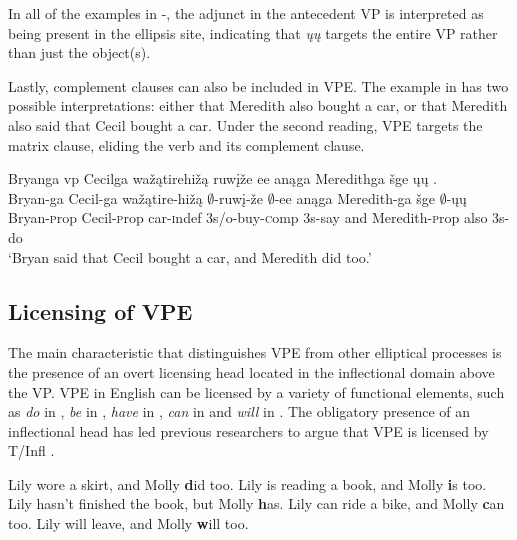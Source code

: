 \documentclass[output=paper]{LSP/langsci}
\begin{document}
In all of the examples in -, the adjunct in the antecedent VP is interpreted as being present in the ellipsis site, indicating that \emph{ųų} targets the entire VP rather than just the object(s).

Lastly, complement clauses can also be included in VPE. The example in  has two possible interpretations: either that Meredith also bought a car, or that Meredith also said that Cecil bought a car. Under the second reading, VPE targets the matrix clause, eliding the verb and its complement clause.

\ea\label{ex:johnson:11}
\glll Bryanga {\ob}{vp} Cecilga wažątirehižą ruwįže ee{\cb} anąga Meredithga šge {\ob}ųų{\cb} .\\
Bryan-ga {} Cecil-ga wažątire-hižą $\emptyset$-ruwį-že $\emptyset$-ee anąga Meredith-ga šge $\emptyset$-ųų\\
Bryan-{\textsc prop} {} Cecil-{\textsc prop} car-{\textsc indef} {\textsc 3s/o}-buy-{\textsc comp} {\textsc 3s}-say and Meredith-{\textsc prop} also {\textsc 3s}-do\\
\trans `Bryan said that Cecil bought a car, and Meredith did too.'
\z


\subsection{Licensing of VPE}\label{sec:johnson:2.2}

The main characteristic that distinguishes VPE from other elliptical processes is the presence of an overt licensing head located in the inflectional domain above the VP. VPE in English can be licensed by a variety of functional elements, such as \emph{do} in , \emph{be} in , \emph{have} in , \emph{can} in  and \emph{will} in . The obligatory presence of an inflectional head has led previous researchers to argue that VPE is licensed by T/Infl \citep{Bresnan1976,Sag1976,Zagona1988,Lobeck1995}.

\ea\label{ex:johnson:12}
\ea\label{ex:johnson:12a}
Lily wore a skirt, and Molly {\textbf did} too.
\ex\label{ex:johnson:12b}
Lily is reading a book, and Molly {\textbf is} too.
\ex\label{ex:johnson:12c}
Lily hasn't finished the book, but Molly {\textbf has}.
\ex\label{ex:johnson:12d}
Lily can ride a bike, and Molly {\textbf can} too.
\ex\label{ex:johnson:12e}
Lily will leave, and Molly {\textbf will} too.
\z
\z
\end{document}
